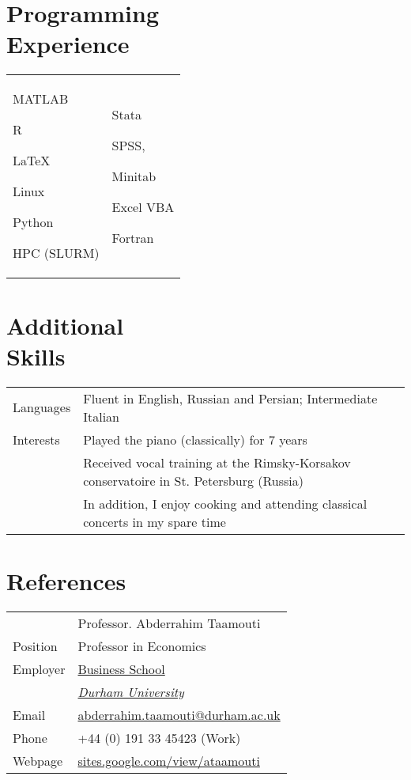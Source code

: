 \documentclass[margin,line,pifont,palatino,courier]{res}
\newenvironment{list1}{
  \begin{list}{\ding{113}}{%
      \setlength{\itemsep}{0in}
      \setlength{\parsep}{0in} \setlength{\parskip}{0in}
      \setlength{\topsep}{0in} \setlength{\partopsep}{0in}
      \setlength{\leftmargin}{0.17in}}}{\end{list}}
\begin{document}
\begin{resume}
\section{\sc \bf Programming \\ Experience}
\begin{tabular}{@{}p{2.3in}p{3in}}
\begin{list1}
\item MATLAB
\item R
\item \LaTeX
\item Linux
\item Python
\item HPC (SLURM)
\end{list1}
&
\begin{list1}
\item Stata
\item SPSS,
\item Minitab
\item Excel VBA
\item Fortran
\end{list1}

\end{tabular}

\hrulefill

\section{\sc \bf Additional \\ Skills}

\begin{tabular}{@{}p{0.8in}p{4in}}

Languages& Fluent in English, Russian and Persian; Intermediate Italian\\
\rule{0pt}{4ex}Interests& Played the piano (classically) for 7 years\\
&Received vocal training at the Rimsky-Korsakov conservatoire in St. Petersburg (Russia)\\
&In addition, I enjoy cooking and attending classical concerts in my spare time
\end{tabular}

\hrulefill

\section{\sc \bf References}

\begin{tabular}{@{}p{0.8in}p{4in}}
& Professor. Abderrahim Taamouti \\
Position&Professor in Economics\\
Employer&\href{https://www.dur.ac.uk/business/}{Business School}\\
&\href{https://www.dur.ac.uk/}{\textit{Durham University}}\\
Email & \href{mailto: abderrahim.taamouti@durham.ac.uk}{abderrahim.taamouti@durham.ac.uk}\\
Phone &+44 (0) 191 33 45423 (Work)\\
Webpage&\href{https://sites.google.com/view/ataamouti}{sites.google.com/view/ataamouti}
\end{tabular}


\end{resume}
\end{document}
